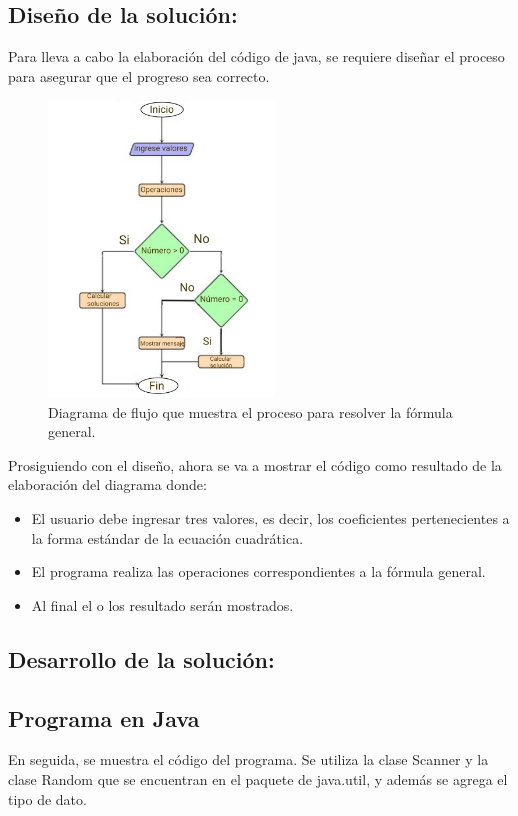 \newline
\subsection{\textbf{Diseño de la solución:}}
Para lleva a cabo la elaboración del código de java, se requiere diseñar el proceso para asegurar que el progreso sea correcto.

\begin{figure}[H]
\centering
\includegraphics[width=6cm]{LaTeX/latex-imagenes/diagramaflujo.jpg}
\caption{Diagrama de flujo que muestra el proceso para resolver la fórmula general.}
\label{fig:diagrama_flujo}
\end{figure}

\newline

Prosiguiendo con el diseño, ahora se va a mostrar el código como resultado de la elaboración del diagrama donde:

\begin{itemize}
  \item El usuario debe ingresar tres valores, es decir, los coeficientes pertenecientes a la forma estándar de la ecuación cuadrática.
  \item El programa realiza las operaciones correspondientes a la fórmula general.
  \item Al final el o los resultado serán mostrados.
\end{itemize}
\subsection{\textbf{Desarrollo de la solución:}}
\subsection{Programa en Java}
En seguida, se muestra el código del programa.
Se utiliza la clase Scanner y la clase Random que se encuentran en el paquete de java.util, y además se agrega el tipo de dato.

